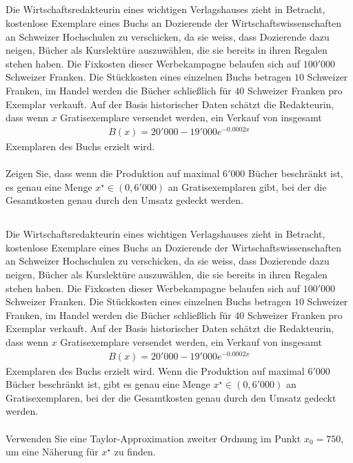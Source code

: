 \subsection*{} 
Die Wirtschaftsredakteurin eines wichtigen Verlagshauses zieht in Betracht,
kostenlose Exemplare eines Buchs an Dozierende der Wirtschaftswissenschaften an Schweizer Hochschulen zu verschicken, da sie weiss, dass Dozierende dazu neigen, Bücher als Kurslektüre auszuwählen, die sie bereits in ihren Regalen stehen haben. Die Fixkosten dieser Werbekampagne belaufen sich auf $100'000$ Schweizer Franken.
Die Stückkosten eines einzelnen Buchs betragen $10$ Schweizer Franken, im Handel werden die Bücher schließlich für $40$ Schweizer Franken pro Exemplar verkauft.
Auf der Basis historischer Daten schätzt die Redakteurin, dass wenn $x$ Gratisexemplare versendet werden, ein Verkauf von insgesamt
\begin{align*}
	B(x) = 20'000 - 19'000 e^{-0.0002 x }
\end{align*}
Exemplaren des Buchs erzielt wird. \\
\\
Zeigen Sie, dass wenn die Produktion auf maximal $6'000$ Bücher beschränkt ist, es genau eine Menge $ x^\star \in (0, 6'000)$ an Gratisexemplaren gibt, bei der die Gesamtkosten genau durch den Umsatz gedeckt werden.


\subsection*{}
Die Wirtschaftsredakteurin eines wichtigen Verlagshauses zieht in Betracht,
kostenlose Exemplare eines Buchs an Dozierende der Wirtschaftswissenschaften an Schweizer Hochschulen zu verschicken, da sie weiss, dass Dozierende dazu neigen, Bücher als Kurslektüre auszuwählen, die sie bereits in ihren Regalen stehen haben. Die Fixkosten dieser Werbekampagne belaufen sich auf $100'000$ Schweizer Franken.
Die Stückkosten eines einzelnen Buchs betragen $10$ Schweizer Franken, im Handel werden die Bücher schließlich für $40$ Schweizer Franken pro Exemplar verkauft.
Auf der Basis historischer Daten schätzt die Redakteurin, dass wenn $x$ Gratisexemplare versendet werden, ein Verkauf von insgesamt
\begin{align*}
	B(x) = 20'000 - 19'000 e^{-0.0002 x }
\end{align*}
Exemplaren des Buchs erzielt wird. Wenn die Produktion auf maximal $6'000$ Bücher beschränkt ist, gibt es genau eine Menge $ x^\star \in (0, 6'000)$ an Gratisexemplaren, bei der die Gesamtkosten genau durch den Umsatz gedeckt werden.\\
\\
Verwenden Sie eine Taylor-Approximation zweiter Ordnung im Punkt $x_0 = 750$, um eine Näherung für $x^\star$ zu finden.
 \\
\\

